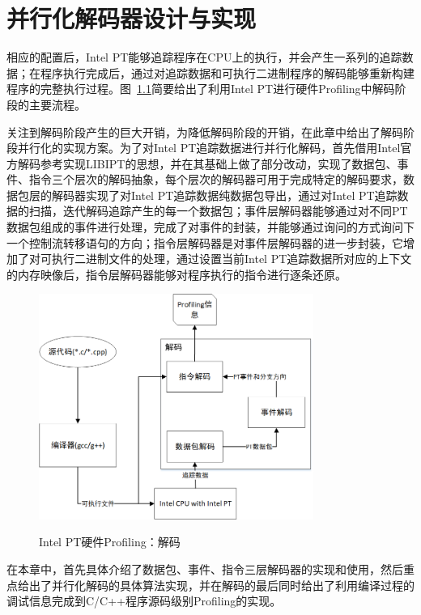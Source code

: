 
\chapter{并行化解码器设计与实现}
相应的配置后，Intel PT能够追踪程序在CPU上的执行，并会产生一系列的追踪数据；在程序执行完成后，通过对追踪数据和可执行二进制程序的解码能够重新构建程序的完整执行过程。图~\ref{fig:bigpicture}简要给出了利用Intel PT进行硬件Profiling中解码阶段的主要流程。

关注到解码阶段产生的巨大开销，为降低解码阶段的开销，在此章中给出了解码阶段并行化的实现方案。为了对Intel PT追踪数据进行并行化解码，首先借用Intel官方解码参考实现LIBIPT的思想，并在其基础上做了部分改动，实现了数据包、事件、指令三个层次的解码抽象，每个层次的解码器可用于完成特定的解码要求，数据包层的解码器实现了对Intel PT追踪数据纯数据包导出，通过对Intel PT追踪数据的扫描，迭代解码追踪产生的每一个数据包；事件层解码器能够通过对不同PT数据包组成的事件进行处理，完成了对事件的封装，并能够通过询问的方式询问下一个控制流转移语句的方向；指令层解码器是对事件层解码器的进一步封装，它增加了对可执行二进制文件的处理，通过设置当前Intel PT追踪数据所对应的上下文的内存映像后，指令层解码器能够对程序执行的指令进行逐条还原。

\begin{figure}[!htb]
	\centering
	\includegraphics[width=0.8\textwidth]
	{figures/BigPicture.png}\\
	\caption{Intel PT硬件Profiling：解码}
	\label{fig:bigpicture}
\end{figure}

在本章中，首先具体介绍了数据包、事件、指令三层解码器的实现和使用，然后重点给出了并行化解码的具体算法实现，并在解码的最后同时给出了利用编译过程的调试信息完成到C/C++程序源码级别Profiling的实现。

